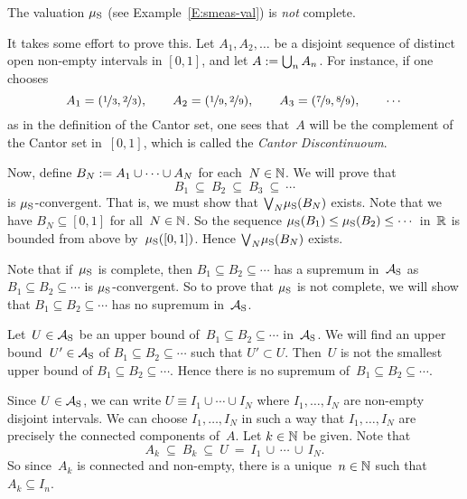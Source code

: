 \documentclass[main.tex]{subfiles}
\begin{document}
%
\begin{ex}
The valuation $\mu_{\mathrm{S}}$ 
(see Example~\ref{E:smeas-val}) is \emph{not} complete.

It takes some effort to prove this.
Let $A_1,A_2,\dotsc$ be a
disjoint sequence of distinct open non-empty intervals in $[0,1]$,
and let $A:= \bigcup_{n} A_n$.
For instance, if one chooses
\begin{equation*}
A_1 = (\nicefrac{1}{3},\nicefrac{2}{3}),\qquad
A_2 = (\nicefrac{1}{9},\nicefrac{2}{9}),\qquad
A_3 = (\nicefrac{7}{9},\nicefrac{8}{9}),\qquad\dotsb
\end{equation*}
as in the definition of the Cantor set,
one sees that~$A$ will be
the  complement of the Cantor set in~$[0,1]$,
which is called  the \emph{Cantor Discontinuoum}.

Now, define $B_N := A_1 \cup \dotsb \cup A_N$
for each~$N\in \mathbb{N}$.
We will prove that
\begin{equation*}
B_1 \ \subseteq \ B_2 \ \subseteq \ B_3 \ \subseteq \ \dotsb
\end{equation*}
is $\mu_{\mathrm{S}}$-convergent.
That is,
we must show that $\textstyle{\bigvee}_N \mu_{\mathrm{S}} (B_N)$ exists.
Note that we have
$B_N \subseteq [0,1]$ for all~$N\in\mathbb{N}$.
So the sequence $\mu_{\mathrm{S}}(B_1) \leq \mu_{\mathrm{S}}(B_2) \leq \dotsb$ in~$\mathbb{R}$
is bounded from above by~$\mu_{\mathrm{S}}([0,1])$.
Hence $\textstyle{\bigvee}_N \mu_{\mathrm{S}}(B_N)$ exists.

Note that if~$\mu_{\mathrm{S}}$ is complete,
then $B_1 \subseteq B_2 \subseteq \dotsb$
has a supremum in~$\mathcal{A}_{\mathrm{S}}$
as $B_1 \subseteq B_2 \subseteq \dotsb$
is $\mu_{\mathrm{S}}$-convergent.
So to prove that $\mu_{\mathrm{S}}$
is not complete,
we will show that 
$B_1 \subseteq B_2 \subseteq \dotsb$
has no supremum in~$\mathcal{A}_{\mathrm{S}}$.

Let~$U\in\mathcal{A}_{\mathrm{S}}$ be an upper bound of~$B_1\subseteq B_2 \subseteq \dotsb$
in~$\mathcal{A}_{\mathrm{S}}$. We will find an upper bound~$U'\in\mathcal{A}_{\mathrm{S}}$
of $B_1\subseteq B_2 \subseteq\dotsb$
such that $U'\subset U$.
Then~$U$ is not the smallest upper bound of
$B_1 \subseteq B_2 \subseteq\dotsb$.
Hence there is no supremum of~$B_1 \subseteq B_2 \subseteq\dotsb$.

Since $U\in\mathcal{A}_{\mathrm{S}}$,
we can write $U\equiv I_1 \cup \dotsb \cup I_N$
where $I_1,\dotsc,I_N$ are non-empty disjoint intervals.
We can choose $I_1,\dotsc,I_N$
in such a way that $I_1,\dotsc,I_N$ are precisely
the connected components of~$A$.
Let $k\in\mathbb{N}$ be given.
Note that 
\begin{equation*}
A_k\ \subseteq \ B_k \ \subseteq \ U \ =\ 
I_1 \,\cup\,\dotsb\,\cup\,I_N.
\end{equation*}
So since~$A_k$ is connected and non-empty,
there is a unique~$n\in \mathbb{N}$ such that $A_k \subseteq I_n$.


\end{ex}
\end{document}
